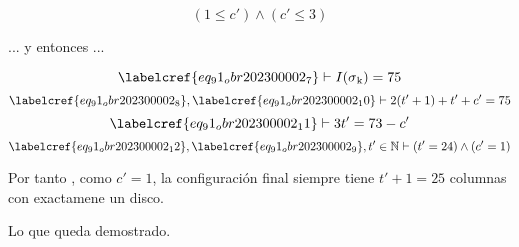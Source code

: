 \begin{equation} \label{eq_91_obr202300002_9}
	(1 \leq c') \land (c' \leq 3)
\end{equation}

... y entonces ...

\begin{equation} \label{eq_91_obr202300002_10}
	\labelcref{eq_91_obr202300002_7} \vdash I(\sigma\textsubscript{k}) = 75
\end{equation}
\begin{equation} \label{eq_91_obr202300002_11}
	\labelcref{eq_91_obr202300002_8}, \labelcref{eq_91_obr202300002_10} \vdash 2 (t'+1) + t' + c' = 75
\end{equation}
\begin{equation} \label{eq_91_obr202300002_12}
	\labelcref{eq_91_obr202300002_11} \vdash 3 t' = 73 - c'
\end{equation}
\begin{equation} \label{eq_91_obr202300002_12}
	\labelcref{eq_91_obr202300002_12}, \labelcref{eq_91_obr202300002_9}, t' \in \mathbb{N} \vdash (t' = 24) \land (c' = 1)
\end{equation}

Por tanto , como $c' = 1$, la configuración final siempre tiene $t'+ 1 = 25$ columnas con exactamene un disco.

\vspace{1cm}
Lo que queda demostrado. \\\\\\
